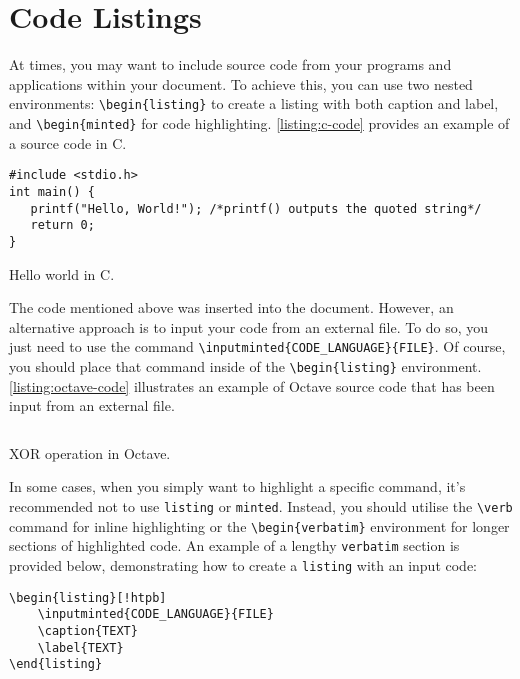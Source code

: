 \chapter{Code Listings}
At times, you may want to include source code from your programs and applications within your document. To achieve this, you can use two nested environments: \verb|\begin{listing}| to create a listing with both caption and label, and \verb|\begin{minted}| for code highlighting. \autoref{listing:c-code} provides an example of a source code in C.

\begin{listing}[!htpb]
\begin{verbatim}
#include <stdio.h>
int main() {
   printf("Hello, World!"); /*printf() outputs the quoted string*/
   return 0;
}
\end{verbatim}
\caption{Hello world in C.}
\label{listing:c-code}
\end{listing}

The code mentioned above was inserted into the document. However, an alternative approach is to input your code from an external file. To do so, you just need to use the command \verb|\inputminted{CODE_LANGUAGE}{FILE}|. Of course, you should place that command inside of the \verb|\begin{listing}| environment. \autoref{listing:octave-code} illustrates an example of Octave source code that has been input from an external file.

\begin{listing}[!htpb]
\inputminted{octave}{Code/BitXorMatrix.m}
\caption{XOR operation in Octave.}
\label{listing:octave-code}
\end{listing}

In some cases, when you simply want to highlight a specific command, it's recommended not to use \verb|listing| or \verb|minted|. Instead, you should utilise the \verb|\verb| command for inline highlighting or the \verb|\begin{verbatim}| environment for longer sections of highlighted code. An example of a lengthy \verb|verbatim| section is provided below, demonstrating how to create a \verb|listing| with an input code:

\begin{verbatim}
\begin{listing}[!htpb]
    \inputminted{CODE_LANGUAGE}{FILE}
    \caption{TEXT}
    \label{TEXT}
\end{listing}
\end{verbatim}

